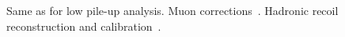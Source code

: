 
Same as for low pile-up analysis. 
Muon corrections~\cite{Sydorenko:2657116}.
Hadronic recoil reconstruction and calibration~\cite{Li:2657182}.
